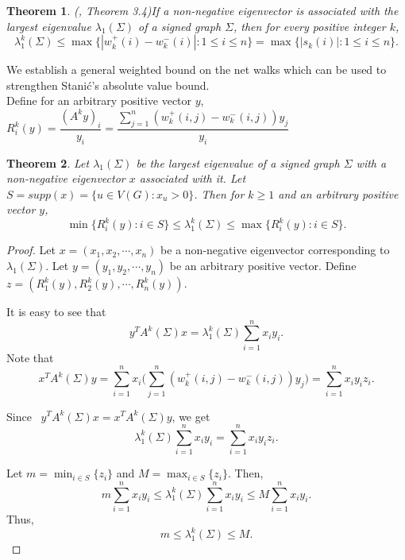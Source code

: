 \documentclass[12pt]{article}
\theoremstyle{plain}
\newtheorem{theorem}{Theorem}[section]
\numberwithin{equation}{section}
\begin{document}
	\begin{theorem}\emph{(\cite{Stanic2019bounding}, Theorem 3.4)}\label{Stanic_result}
		If a non-negative eigenvector is associated with the largest eigenvalue $\lambda_{1}(\Sigma)$ of a signed graph $\Sigma$, then for every positive integer $k$,
		\[\lambda_{1}^{k}(\Sigma)\leq \max\{|w_{k}^{+}(i)-w_{k}^{-}(i)| : 1\leq i \leq n\}=\max\{\vert s_k(i) \vert : 1 \leq i \leq n \}.\]
	\end{theorem}
	
	We establish a general weighted bound on the net walks which can be used to strengthen Stani{\'c}'s absolute value bound.\\
	Define  for an arbitrary positive vector $y$, $R^{k}_i(y)= \dfrac{(A^ky)_i}{y_i}=\dfrac{\sum \limits_{j=1}^{n}(w_k^+(i,j)-w_k^-(i,j))y_j}{y_i}$
	
	\begin{theorem}\label{weighted_bound}
		Let $\lambda_{1}(\Sigma)$ be the largest eigenvalue of a signed graph $\Sigma$ with a non-negative eigenvector $x$ associated with it. Let $S=supp(x)=\{u \in V(G) : x_u >0\}$. Then for $k \geq 1$ and an arbitrary positive vector $y$,
		\[\min\{R^{k}_i(y) : i \in S\}\leq \lambda_{1}^{k}(\Sigma)\leq \max\{R^{k}_i(y) : i \in S\}.\] 
	\end{theorem}
	\begin{proof}
		Let $x=({x_{1},x_{2}, \cdots, x_{n}})$ be a non-negative eigenvector corresponding to $\lambda_{1}(\Sigma)$. Let $y=(y_{1}, y_{2}, \cdots, y_{n})$ be an arbitrary positive vector. Define $z=(R^{k}_1(y),R^{k}_2(y),\cdots, R^{k}_n(y))$.
		
		It is easy to see that  $$ y^{T}A^{k}(\Sigma)x =\lambda_{1}^{k}(\Sigma)\sum_{i=1}^{n}x_{i}y_{i}.$$ 
		Note that $$x^{T}A^{k}(\Sigma)y=\sum_{i=1}^{n}x_{i}\Big(\sum_{j=1}^{n}(w_{k}^{+}(i,j)-w_{k}^{-}(i,j))y_{j}\Big)=\sum_{i=1}^{n}x_{i}y_{i}z_{i}.$$
		
		
		Since~ $y^{T}A^{k}(\Sigma)x=x^{T}A^{k}(\Sigma)y$, we get
		$$\lambda_{1}^{k}(\Sigma)\sum_{i=1}^{n}x_{i}y_{i}=\sum_{i=1}^{n}x_{i}y_{i}z_{i}.$$
		
		Let $m=\min_{i \in S}\{z_{i}\}$ and $ M=\max_{i \in S}\{z_{i}\}.$ Then, $$m\sum_{i=1}^{n}x_{i}y_{i} \leq \lambda_{1}^{k}(\Sigma)\sum_{i=1}^{n}x_{i}y_{i}\leq M\sum_{i=1}^{n}x_{i}y_{i}.$$ Thus, $$m\leq \lambda_{1}^{k}(\Sigma)\leq M.$$
		
	\end{proof}
	
\end{document}
